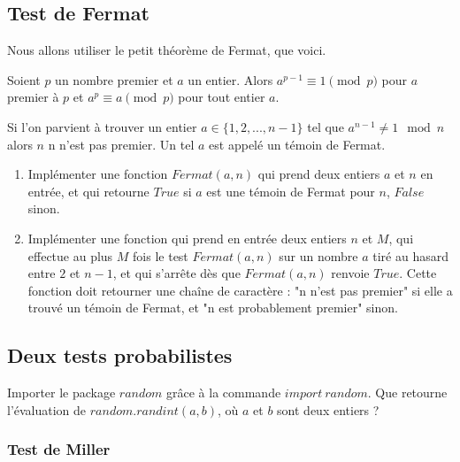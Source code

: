 \subsection{Test de Fermat}

Nous allons utiliser le petit théorème de Fermat, que voici.
\begin{thm}
Soient $p$ un nombre premier et $a$ un entier. Alors $a^{p-1} \equiv 1\pmod p$ pour $a$ premier à $p$ et $a^p\equiv a \pmod p$ pour tout entier $a$.
\end{thm}

Si l'on parvient à trouver un entier $a\in \{1,2,...,n-1\}$ tel que $a^{n-1}\neq 1\mod n$ alors $n$ n n'est pas premier. Un tel $a$ est appelé un témoin de Fermat.
\begin{enumerate}
\item Implémenter une fonction $Fermat(a,n)$ qui prend deux entiers $a$ et $n$ en entrée, et qui retourne $True$ si $a$ est une témoin de Fermat pour $n$, $False$ sinon.
\item Implémenter une fonction qui prend en entrée deux entiers $n$ et $M$, qui effectue au plus $M$ fois le test $Fermat(a,n)$ sur un nombre $a$ tiré au hasard entre $2$ et $n-1$, et qui s'arrête dès que $Fermat(a,n)$ renvoie $True$. Cette fonction doit retourner une chaîne de caractère : "n n'est pas premier" si elle a trouvé un témoin de Fermat, et "n est probablement premier" sinon.
\end{enumerate}

\subsection{Deux tests probabilistes}

Importer le package $random$ grâce à la commande $import \ random$. Que retourne l'évaluation de $random.randint(a,b)$, où $a$ et $b$ sont deux entiers ?

\subsubsection{Test de Miller}

